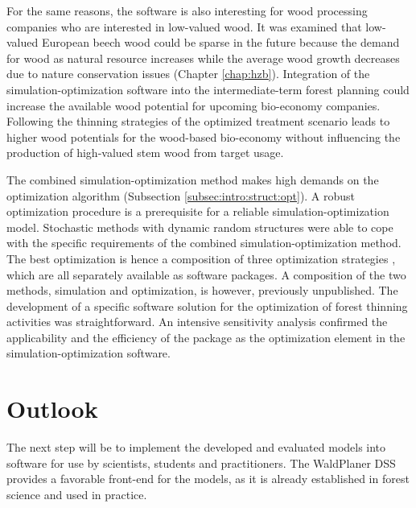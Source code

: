 For the same reasons, the software is also interesting for wood processing companies who are interested in low-valued wood. It was examined that low-valued European beech wood could be sparse in the future because the demand for wood as natural resource increases while the average wood growth decreases due to nature conservation issues (Chapter \ref{chap:hzb}). Integration of the simulation-optimization software into the intermediate-term forest planning could increase the available wood potential for upcoming bio-economy companies. Following the thinning strategies of the optimized treatment scenario leads to higher wood potentials for the wood-based bio-economy without influencing the production of high-valued stem wood from target usage.

The combined si\-mu\-la\-tion-op\-ti\-mi\-za\-tion method makes high demands on the optimization algorithm (Subsection \ref{subsec:intro:struct:opt}). A robust optimization procedure is a prerequisite for a reliable si\-mu\-la\-tion-op\-ti\-mi\-za\-tion model. Stochastic methods with dynamic random structures were able to cope with the specific requirements of the combined si\-mu\-la\-tion-op\-ti\-mi\-za\-tion method. The best optimization is hence a composition of three optimization strategies \citep{corana_1987, kirkpatrick_1983, pronzato_1984}, which are all separately available as software packages. A composition of the two methods, simulation and optimization, is however, previously unpublished. The development of a specific software solution for the optimization of forest thinning activities was straightforward. An intensive sensitivity analysis confirmed the applicability and the efficiency of the package as the optimization element in the si\-mu\-la\-tion-op\-ti\-mi\-za\-tion software.

\section{Outlook}
\label{sec:discussion:outlook}
The next step will be to implement the developed and evaluated models into software for use by scientists, students and practitioners. The WaldPlaner DSS provides a favorable front-end for the models, as it is already established in forest science and used in practice.

